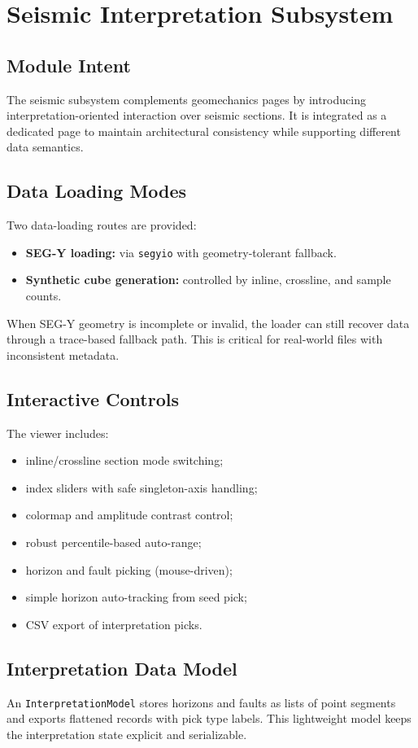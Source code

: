 \documentclass[12pt,a4paper]{report}
\begin{document}
\chapter{Seismic Interpretation Subsystem}
\section{Module Intent}
The seismic subsystem complements geomechanics pages by introducing interpretation-oriented interaction over seismic sections. It is integrated as a dedicated page to maintain architectural consistency while supporting different data semantics.

\section{Data Loading Modes}
Two data-loading routes are provided:
\begin{itemize}
    \item \textbf{SEG-Y loading:} via \texttt{segyio} with geometry-tolerant fallback.
    \item \textbf{Synthetic cube generation:} controlled by inline, crossline, and sample counts.
\end{itemize}

When SEG-Y geometry is incomplete or invalid, the loader can still recover data through a trace-based fallback path. This is critical for real-world files with inconsistent metadata.

\section{Interactive Controls}
The viewer includes:
\begin{itemize}
    \item inline/crossline section mode switching;
    \item index sliders with safe singleton-axis handling;
    \item colormap and amplitude contrast control;
    \item robust percentile-based auto-range;
    \item horizon and fault picking (mouse-driven);
    \item simple horizon auto-tracking from seed pick;
    \item CSV export of interpretation picks.
\end{itemize}

\section{Interpretation Data Model}
An \texttt{InterpretationModel} stores horizons and faults as lists of point segments and exports flattened records with pick type labels. This lightweight model keeps the interpretation state explicit and serializable.
\end{document}
